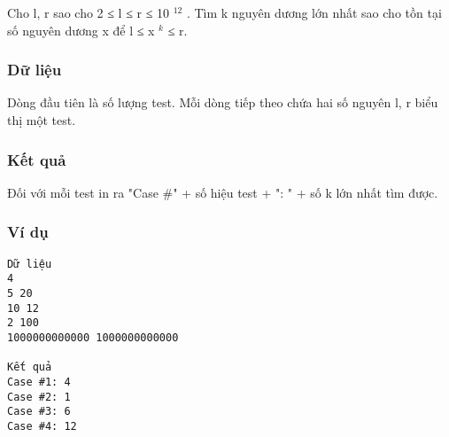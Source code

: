 



   Cho l, r sao cho 2 ≤ l ≤ r ≤ 10   $^    12   $   . Tìm k nguyên dương lớn nhất sao cho tồn tại số nguyên dương x để l ≤ x   $^    k   $   ≤ r.  

\subsubsection{   Dữ liệu  }

   Dòng đầu tiên là số lượng test. Mỗi dòng tiếp theo chứa hai số nguyên l, r biểu thị một test.  

\subsubsection{   Kết quả  }

   Đối với mỗi test in ra "Case \#" + số hiệu test + ": " + số k lớn nhất tìm được.  

\subsubsection{   Ví dụ  }
\begin{verbatim}
Dữ liệu
4
5 20
10 12
2 100
1000000000000 1000000000000

Kết quả
Case #1: 4
Case #2: 1
Case #3: 6
Case #4: 12
\end{verbatim}